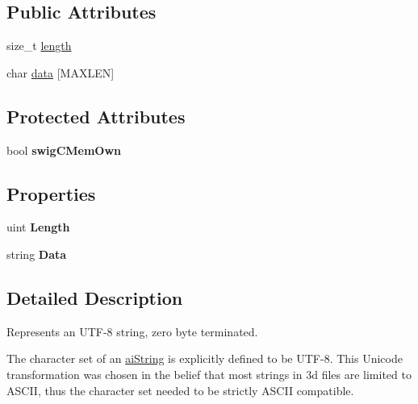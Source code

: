 \subsection*{Public Attributes}
\begin{DoxyCompactItemize}
\item 
size\+\_\+t \hyperlink{structai_string_a7d77c2031ff0340746aa046f7fbcf313}{length}
\item 
char \hyperlink{structai_string_aa90b1da7d347a3dcca0a95061e6ea41d}{data} \mbox{[}M\+A\+X\+L\+E\+N\mbox{]}
\end{DoxyCompactItemize}
\subsection*{Protected Attributes}
\begin{DoxyCompactItemize}
\item 
\hypertarget{structai_string_a43fad9918c0fd93af455b6a50249bdf6}{bool {\bfseries swig\+C\+Mem\+Own}}\label{structai_string_a43fad9918c0fd93af455b6a50249bdf6}

\end{DoxyCompactItemize}
\subsection*{Properties}
\begin{DoxyCompactItemize}
\item 
\hypertarget{structai_string_ac15d04fcd89a9d07e8dd76a0952232c1}{uint {\bfseries Length}}\label{structai_string_ac15d04fcd89a9d07e8dd76a0952232c1}

\item 
\hypertarget{structai_string_a15feaa994294ec6842a26521d503c51b}{string {\bfseries Data}}\label{structai_string_a15feaa994294ec6842a26521d503c51b}

\end{DoxyCompactItemize}


\subsection{Detailed Description}
Represents an U\+T\+F-\/8 string, zero byte terminated.

The character set of an \hyperlink{structai_string}{ai\+String} is explicitly defined to be U\+T\+F-\/8. This Unicode transformation was chosen in the belief that most strings in 3d files are limited to A\+S\+C\+I\+I, thus the character set needed to be strictly A\+S\+C\+I\+I compatible.

